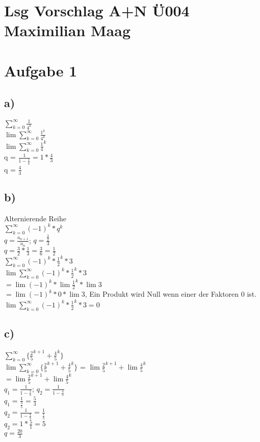 \documentclass{article}
\begin{document}
	\section*{Lsg Vorschlag A+N Ü004 Maximilian Maag}
	\section*{Aufgabe 1}
	\subsection*{a)}
	$\sum\limits_{k=0}^{\infty} \frac{1}{4^{k}} $ \\
	$\lim\sum\limits_{k=0}^{\infty} \frac{1^{k}}{4^{k}} $ \\
	$\lim\sum\limits_{k=0}^{\infty} \frac{1}{4}^{k} $ \\
	q = $\frac{1}{1 - \frac{1}{4}} = 1 * \frac{4}{3}$ \\
	q = $\frac{4}{3}$
	\subsection*{b)}
	Alternierende Reihe \\
	$\sum\limits_{k=0}^{\infty}(-1)^{k}*q^{k}$ \\
	$q = \frac{a_{n+1}}{a_{n}}$; $q = \frac{\frac{3}{2}}{3}$ \\
	$q = \frac{3}{2} * \frac{1}{3} = \frac{3}{6} = \frac{1}{2}$ \\
	$\sum\limits_{k=0}^{\infty}(-1)^{k}*\frac{1}{2}^{k} * 3$ \\
	$\lim\sum\limits_{k=0}^{\infty}(-1)^{k}*\frac{1}{2}^{k} * 3$ \\
	$= \lim(-1)^{k} * \lim\frac{1}{2}^{k} * \lim3$ \\
	$= \lim(-1)^{k} * 0 * \lim3$, Ein Produkt wird Null wenn einer der Faktoren 0 ist. \\
	$\lim\sum\limits_{k=0}^{\infty}(-1)^{k}*\frac{1}{2}^{k} * 3 = 0$
	\subsection*{c)}
	$\sum\limits_{k=0}^{\infty}\{\frac{2}{5}^{k+1}+\frac{4}{5}^{k}\}$ \\
	$\lim\sum\limits_{k=0}^{\infty}\{\frac{2}{5}^{k+1}+\frac{4}{5}^{k}\}$ = $\lim\frac{2}{5}^{k+1} + \lim\frac{4}{5}^{k}$ \\
	$ = \lim\frac{2}{5}^{k+1} + \lim\frac{4}{5}^{k}$ \\
	$q_{1} = \frac{1}{1 - \frac{2}{5}}$; $q_{2} = \frac{1}{1 - \frac{4}{5}}$ \\
	$q_{1} = \frac{1}{\frac{3}{5}} = \frac{5}{3}$ \\
	$q_{2} = \frac{1}{1 - \frac{4}{5}} = \frac{1}{\frac{1}{5}}$ \\
	$q_{2} = 1 * \frac{5}{1} = 5$ \\
	$q = \frac{20}{3}$
\end{document}

